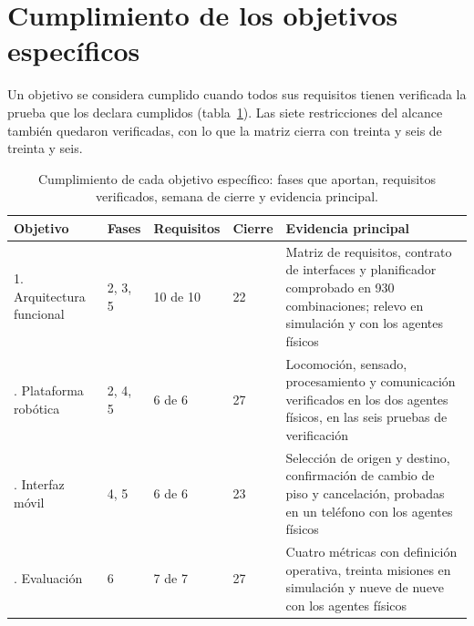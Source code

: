 \section{Cumplimiento de los objetivos específicos}
\label{sec:cumplimiento}

Un objetivo se considera cumplido cuando todos sus requisitos tienen verificada la prueba que los declara cumplidos (tabla~\ref{tab:cumplimiento}). Las siete restricciones del alcance también quedaron verificadas, con lo que la matriz cierra con treinta y seis de treinta y seis.

\begin{table}[H]
  \centering\footnotesize
  \caption{Cumplimiento de cada objetivo específico: fases que aportan, requisitos verificados, semana de cierre y evidencia principal.}
  \label{tab:cumplimiento}
  \begin{tabular}{@{}p{}p{}p{}p{}p{}@{}}
    \toprule
    \textbf{Objetivo} & \textbf{Fases} & \textbf{Requisitos} & \textbf{Cierre} & \textbf{Evidencia principal} \\ \midrule
    1. Arquitectura funcional & 2, 3, 5 & 10 de 10 & 22 & Matriz de requisitos, contrato de interfaces y planificador comprobado en 930 combinaciones; relevo en simulación y con los agentes físicos \\ \addlinespace
    2. Plataforma robótica & 2, 4, 5 & 6 de 6 & 27 & Locomoción, sensado, procesamiento y comunicación verificados en los dos agentes físicos, en las seis pruebas de verificación \\ \addlinespace
    3. Interfaz móvil & 4, 5 & 6 de 6 & 23 & Selección de origen y destino, confirmación de cambio de piso y cancelación, probadas en un teléfono con los agentes físicos \\ \addlinespace
    4. Evaluación & 6 & 7 de 7 & 27 & Cuatro métricas con definición operativa, treinta misiones en simulación y nueve de nueve con los agentes físicos \\ \bottomrule
  \end{tabular}
\end{table}
